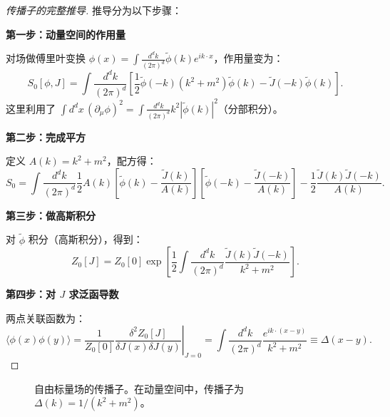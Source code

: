 \begin{proof}[传播子的完整推导]
推导分为以下步骤：

\textbf{第一步：动量空间的作用量}

对场做傅里叶变换 $\phi(x) = \int \frac{d^d k}{(2\pi)^d} \tilde{\phi}(k) e^{ik\cdot x}$，作用量变为：
\begin{equation}
    S_0[\phi, J] = \int \frac{d^d k}{(2\pi)^d} \left[\frac{1}{2}\tilde{\phi}(-k)(k^2 + m^2)\tilde{\phi}(k) - \tilde{J}(-k)\tilde{\phi}(k)\right].
\end{equation}
这里利用了 $\int d^d x \, (\partial_\mu \phi)^2 = \int \frac{d^d k}{(2\pi)^d} k^2 |\tilde{\phi}(k)|^2$（分部积分）。

\textbf{第二步：完成平方}

定义 $A(k) = k^2 + m^2$，配方得：
\begin{equation}
    S_0 = \int \frac{d^d k}{(2\pi)^d} \frac{1}{2}A(k)\left[\tilde{\phi}(k) - \frac{\tilde{J}(k)}{A(k)}\right]\left[\tilde{\phi}(-k) - \frac{\tilde{J}(-k)}{A(k)}\right] - \frac{1}{2}\frac{\tilde{J}(k)\tilde{J}(-k)}{A(k)}.
\end{equation}

\textbf{第三步：做高斯积分}

对 $\tilde{\phi}$ 积分（高斯积分），得到：
\begin{equation}
    Z_0[J] = Z_0[0] \exp\left[\frac{1}{2}\int \frac{d^d k}{(2\pi)^d} \frac{\tilde{J}(k)\tilde{J}(-k)}{k^2 + m^2}\right].
\end{equation}

\textbf{第四步：对 $J$ 求泛函导数}

两点关联函数为：
\begin{equation}
    \langle \phi(x)\phi(y)\rangle = \frac{1}{Z_0[0]}\left.\frac{\delta^2 Z_0[J]}{\delta J(x)\delta J(y)}\right|_{J=0} = \int \frac{d^d k}{(2\pi)^d} \frac{e^{ik\cdot(x-y)}}{k^2 + m^2} \equiv \Delta(x-y).
\end{equation}
\end{proof}

\begin{figure}[htbp]
\centering
{}
\caption{自由标量场的传播子。在动量空间中，传播子为 $\Delta(k) = 1/(k^2 + m^2)$。}
\label{fig:propagator}
\end{figure}

